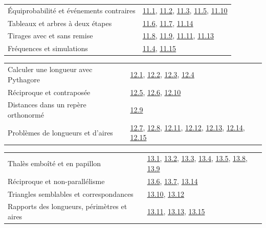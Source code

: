 \begin{tabularx}{\linewidth}{@{}Yl@{}}\toprule
Équiprobabilité et événements contraires & \hyperref[exo-11-1]{11.1}, \hyperref[exo-11-2]{11.2}, \hyperref[exo-11-3]{11.3}, \hyperref[exo-11-5]{11.5}, \hyperref[exo-11-10]{11.10}\\[2mm]
Tableaux et arbres à deux étapes & \hyperref[exo-11-6]{11.6}, \hyperref[exo-11-7]{11.7}, \hyperref[exo-11-14]{11.14}\\[2mm]
Tirages avec et sans remise & \hyperref[exo-11-8]{11.8}, \hyperref[exo-11-9]{11.9}, \hyperref[exo-11-11]{11.11}, \hyperref[exo-11-13]{11.13}\\[2mm]
Fréquences et simulations & \hyperref[exo-11-4]{11.4}, \hyperref[exo-11-15]{11.15}\\[2mm]
\bottomrule\end{tabularx}\par\vspace{4mm}
\begin{tabularx}{\linewidth}{@{}Yl@{}}\toprule
Calculer une longueur avec Pythagore & \hyperref[exo-12-1]{12.1}, \hyperref[exo-12-2]{12.2}, \hyperref[exo-12-3]{12.3}, \hyperref[exo-12-4]{12.4}\\[2mm]
Réciproque et contraposée & \hyperref[exo-12-5]{12.5}, \hyperref[exo-12-6]{12.6}, \hyperref[exo-12-10]{12.10}\\[2mm]
Distances dans un repère orthonormé & \hyperref[exo-12-9]{12.9}\\[2mm]
Problèmes de longueurs et d’aires & \hyperref[exo-12-7]{12.7}, \hyperref[exo-12-8]{12.8}, \hyperref[exo-12-11]{12.11}, \hyperref[exo-12-12]{12.12}, \hyperref[exo-12-13]{12.13}, \hyperref[exo-12-14]{12.14}, \hyperref[exo-12-15]{12.15}\\[2mm]
\bottomrule\end{tabularx}\par\vspace{4mm}
\clearpage
{}\fontsize{10}{13}\selectfont
{}\begin{tabularx}{\linewidth}{@{}Yl@{}}\toprule
Thalès emboîté et en papillon & \hyperref[exo-13-1]{13.1}, \hyperref[exo-13-2]{13.2}, \hyperref[exo-13-3]{13.3}, \hyperref[exo-13-4]{13.4}, \hyperref[exo-13-5]{13.5}, \hyperref[exo-13-8]{13.8}, \hyperref[exo-13-9]{13.9}\\[2mm]
Réciproque et non-parallélisme & \hyperref[exo-13-6]{13.6}, \hyperref[exo-13-7]{13.7}, \hyperref[exo-13-14]{13.14}\\[2mm]
Triangles semblables et correspondances & \hyperref[exo-13-10]{13.10}, \hyperref[exo-13-12]{13.12}\\[2mm]
Rapports des longueurs, périmètres et aires & \hyperref[exo-13-11]{13.11}, \hyperref[exo-13-13]{13.13}, \hyperref[exo-13-15]{13.15}\\[2mm]
\bottomrule\end{tabularx}\par\vspace{4mm}
